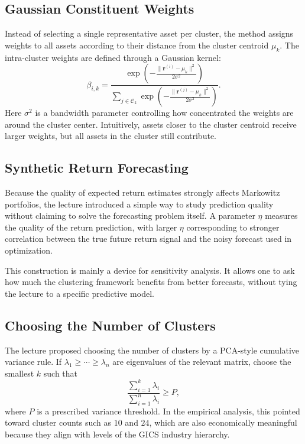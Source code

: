 \documentclass[11pt]{article}
\begin{document}
\subsection{Gaussian Constituent Weights}

Instead of selecting a single representative asset per cluster, the method assigns weights to all assets according to their distance from the cluster centroid $\mu_k$. The intra-cluster weights are defined through a Gaussian kernel:
\begin{equation*}
\beta_{i,k} =
\frac{\exp\left(-\frac{\lVert \mathbf{r}^{(i)} - \mu_k \rVert^2}{2\sigma^2}\right)}
{\sum_{j \in \mathcal{C}_k} \exp\left(-\frac{\lVert \mathbf{r}^{(j)} - \mu_k \rVert^2}{2\sigma^2}\right)}.
\end{equation*}
Here $\sigma^2$ is a bandwidth parameter controlling how concentrated the weights are around the cluster center. Intuitively, assets closer to the cluster centroid receive larger weights, but all assets in the cluster still contribute.

\subsection{Synthetic Return Forecasting}

Because the quality of expected return estimates strongly affects Markowitz portfolios, the lecture introduced a simple way to study prediction quality without claiming to solve the forecasting problem itself. A parameter $\eta$ measures the quality of the return prediction, with larger $\eta$ corresponding to stronger correlation between the true future return signal and the noisy forecast used in optimization.

This construction is mainly a device for sensitivity analysis. It allows one to ask how much the clustering framework benefits from better forecasts, without tying the lecture to a specific predictive model.

\subsection{Choosing the Number of Clusters}

The lecture proposed choosing the number of clusters by a PCA-style cumulative variance rule. If $\lambda_1 \geq \cdots \geq \lambda_n$ are eigenvalues of the relevant matrix, choose the smallest $k$ such that
\begin{equation*}
\frac{\sum_{i=1}^{k}\lambda_i}{\sum_{i=1}^{n}\lambda_i} \geq P,
\end{equation*}
where $P$ is a prescribed variance threshold. In the empirical analysis, this pointed toward cluster counts such as $10$ and $24$, which are also economically meaningful because they align with levels of the GICS industry hierarchy.
\end{document}
